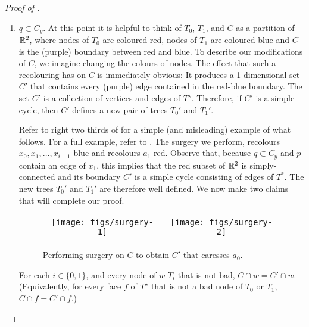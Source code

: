 \documentclass{patmorin}
\newcommand{\dual}[1]{{#1}^\star}
\begin{document}
\begin{proof}[Proof of ]
\begin{enumerate}
   \item $q\subset C_y$.  At this point it is helpful to think of
   $T_0$, $T_1$, and $C$ as a partition of $\mathbb{R}^2$, where nodes of $T_0$
   are coloured red, nodes of $T_1$ are coloured blue and $C$ is the
   (purple) boundary between red and blue.  To describe our modifications
   of $C$, we imagine changing the colours of nodes.  The effect that
   such a recolouring has on $C$ is immediately obvious: It produces a
   1-dimensional set $C'$ that contains every (purple) edge contained in
   the red-blue boundary. The set $C'$ is a collection of vertices and
   edges of $\dual{T}$. Therefore, if $C'$ is a simple cycle, then $C'$
   defines a new pair of trees $T_0'$ and $T_1'$.


   Refer to right two thirds of  for a simple
   (and misleading) example of what follows. For a full example,
   refer to .  The surgery we perform, recolours
   $x_0,x_1,\ldots,x_{i-1}$ blue and recolours $a_1$ red.  Observe that,
   because $q\subset C_y$ and $p$ contain an edge of $x_1$, this implies
   that the red subset of $\mathbb{R}^2$ is simply-connected and its boundary $C'$
   is a simple cycle consisting of edges of $T^*$.  The new trees $T_0'$
   and $T_1'$ are therefore well defined.  We now make two claims that
   will complete our proof.

   \begin{figure}
     \begin{center}
       \begin{tabular}{cc}
         \texttt{[image: figs/surgery-1]} &
         \texttt{[image: figs/surgery-2]} 
       \end{tabular}
     \end{center}
     \caption{Performing surgery on $C$ to obtain $C'$ that caresses $a_0$.}
   \end{figure}

   \begin{clm}
      For each $i\in\{0,1\}$, and every node of $w$ $T_i$ that is not bad,
      $C\cap w=C'\cap w$.  (Equivalently, for every face $f$ of $\dual{T}$
      that is not a bad node of $T_0$ or $T_1$, $C\cap f=C'\cap f$.)
   \end{clm}


\end{enumerate}
\end{proof}
\end{document}
